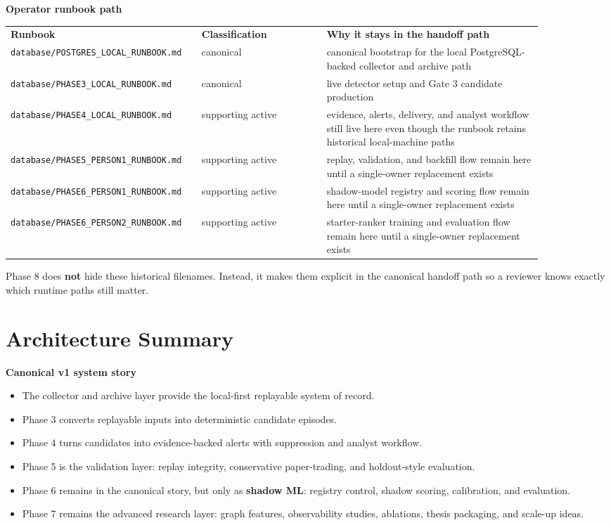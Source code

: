 \documentclass{article}
\begin{document}
\textbf{Operator runbook path}
\begin{longtable}{p{0.28\linewidth}p{0.22\linewidth}p{0.38\linewidth}}
\textbf{Runbook} & \textbf{Classification} & \textbf{Why it stays in the handoff path} \\
\texttt{database/POSTGRES\_LOCAL\_RUNBOOK.md} & canonical & canonical bootstrap for the local PostgreSQL-backed collector and archive path \\
\texttt{database/PHASE3\_LOCAL\_RUNBOOK.md} & canonical & live detector setup and Gate 3 candidate production \\
\texttt{database/PHASE4\_LOCAL\_RUNBOOK.md} & supporting active & evidence, alerts, delivery, and analyst workflow still live here even though the runbook retains historical local-machine paths \\
\texttt{database/PHASE5\_PERSON1\_RUNBOOK.md} & supporting active & replay, validation, and backfill flow remain here until a single-owner replacement exists \\
\texttt{database/PHASE6\_PERSON1\_RUNBOOK.md} & supporting active & shadow-model registry and scoring flow remain here until a single-owner replacement exists \\
\texttt{database/PHASE6\_PERSON2\_RUNBOOK.md} & supporting active & starter-ranker training and evaluation flow remain here until a single-owner replacement exists \\
\end{longtable}

Phase 8 does \textbf{not} hide these historical filenames. Instead, it makes them explicit in the canonical handoff path so a reviewer knows exactly which runtime paths still matter.

\section*{Architecture Summary}
\textbf{Canonical v1 system story}
\begin{itemize}
\item The collector and archive layer provide the local-first replayable system of record.
\item Phase 3 converts replayable inputs into deterministic candidate episodes.
\item Phase 4 turns candidates into evidence-backed alerts with suppression and analyst workflow.
\item Phase 5 is the validation layer: replay integrity, conservative paper-trading, and holdout-style evaluation.
\item Phase 6 remains in the canonical story, but only as \textbf{shadow ML}: registry control, shadow scoring, calibration, and evaluation.
\item Phase 7 remains the advanced research layer: graph features, observability studies, ablations, thesis packaging, and scale-up ideas.
\end{itemize}
\end{document}

